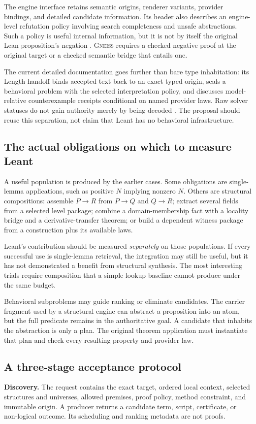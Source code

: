 \documentclass[11pt,letterpaper]{article}
\newcommand{\Gneiss}{\textsc{Gneiss}}
\theoremstyle{definition}
\theoremstyle{remark}
\begin{document}
The engine interface retains semantic origins, renderer variants, provider
bindings, and detailed candidate information. Its header also describes an
engine-level refutation policy involving search completeness and unsafe
abstractions. Such a policy is useful internal information, but it is not by
itself the original Lean proposition's negation \cite{leant-engine}. \Gneiss{}
requires a checked negative proof at the original target or a checked semantic
bridge that entails one.

The current detailed documentation goes further than bare type inhabitation:
its Length handoff binds accepted text back to an exact typed origin, seals a
behavioral problem with the selected interpretation policy, and discusses
model-relative counterexample receipts conditional on named provider laws.
Raw solver statuses do not gain authority merely by being decoded
\cite{leant-internals}. The proposal should reuse this separation, not claim
that Leant has no behavioral infrastructure.

\subsection{The actual obligations on which to measure Leant}
A useful population is produced by the earlier cases. Some obligations are
single-lemma applications, such as positive $N$ implying nonzero $N$. Others
are structural compositions: assemble $P\to R$ from $P\to Q$ and $Q\to R$;
extract several fields from a selected level package; combine a domain-membership
fact with a locality bridge and a derivative-transfer theorem; or build a
dependent witness package from a construction plus its available laws.

Leant's contribution should be measured \emph{separately} on those populations.
If every successful use is single-lemma retrieval, the integration may still
be useful, but it has not demonstrated a benefit from structural synthesis.
The most interesting trials require composition that a simple lookup baseline
cannot produce under the same budget.

Behavioral subproblems may guide ranking or eliminate candidates. The carrier
fragment used by a structural engine can abstract a proposition into an atom,
but the full predicate remains in the authoritative goal. A candidate that
inhabits the abstraction is only a plan. The original theorem application must
instantiate that plan and check every resulting property and provider law.

\subsection{A three-stage acceptance protocol}
\textbf{Discovery.} The request contains the exact target, ordered local
context, selected structures and universes, allowed premises, proof policy,
method constraint, and immutable origin. A producer returns a candidate term,
script, certificate, or non-logical outcome. Its scheduling and ranking
metadata are not proofs.
\end{document}
